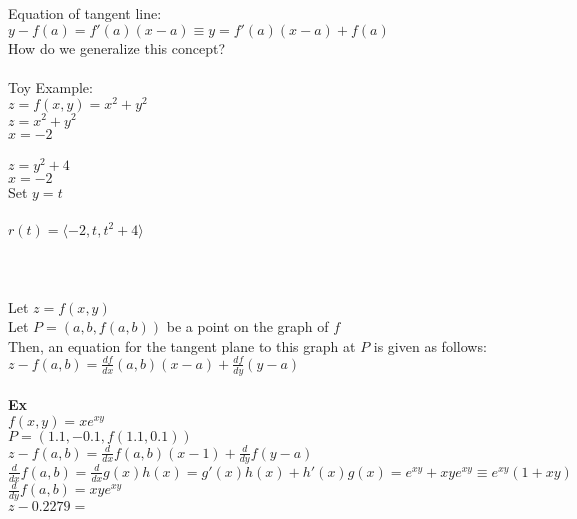 \documentclass[]{article}
\title{\docTitle}
\author{\docAuthor}
\date{\today}
\begin{document}
\maketitle
Equation of tangent line: $y - f(a) = f'(a)(x-a) \equiv y= f'(a)(x-a) + f(a) $\\
How do we generalize this concept?\\
\\
Toy Example:\\
$z = f(x,y) = x^2+y^2$\\
$z = x^2+y^2$\\
$x = -2$\\
\\
$z = y^2 + 4$\\
$x = -2$\\
Set \(y=t\)\\
\\
$r(t) = \langle{-2,t,t^2+4}\rangle$\\
\\
\\
\\
Let $z = f(x,y)$\\
Let $P = (a, b, f(a,b))$ be a point on the graph of $f$\\
Then, an equation for the tangent plane to this graph at $P$ is given as follows:\\
$z-f(a,b) = \frac{df}{dx}(a,b)(x-a)+\frac{df}{dy}(y-a)$
\\
\\
\textbf{Ex}\\
$f(x,y) = xe^{xy}$\\
$P = (1.1, -0.1, f(1.1, 0.1))$\\
$z - f(a,b) = \frac{d}{dx}f(a,b)(x-1) + \frac{d}{dy}f(y-a)$\\
$\frac{d}{dx}f(a,b) = \frac{d}{dx}g(x)h(x) = g'(x)h(x) + h'(x)g(x) = e^{xy} + xye^{xy} \equiv e^{xy}(1 + xy)$\\
$\frac{d}{dy}f(a,b) = xye^{xy}$\\
$z - 0.2279 = $
\end{document}
